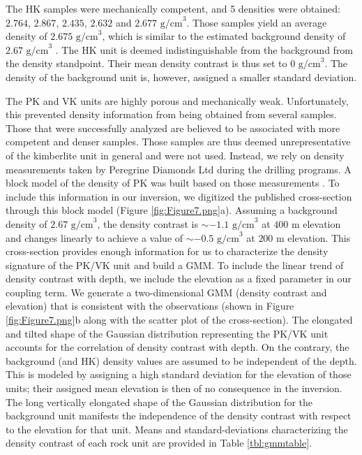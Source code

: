 \documentclass[paper, twocolumn]{geophysics} %
\begin{document}
The HK samples were mechanically competent, and 5 densities were obtained: $2.764$, $2.867$, $2.435$, $2.632$ and $2.677 \text{ g/cm}^3$. Those samples yield an average density of $2.675 \text{ g/cm}^3$, which is similar to the estimated background density of $2.67 \text{ g/cm}^3$ \citep{TKCpaper}. The HK unit is deemed indistinguishable from the background from the density standpoint. Their mean density contrast is thus set to $0 \text{ g/cm}^3$. The density of the background unit is, however, assigned a smaller standard deviation.

The PK and VK units are highly porous and mechanically weak. Unfortunately, this prevented density information from being obtained from several samples. Those that were successfully analyzed are believed to be associated with more competent and denser samples. Those samples are thus deemed unrepresentative of the kimberlite unit in general and were not used. Instead, we rely on density measurements taken by Peregrine Diamonds Ltd during the drilling programs. A block model of the density of PK was built based on those measurements \citep{TechnicalReport}. To include this information in our inversion, we digitized the published cross-section through this block model (Figure \ref{fig:Figure7.png}a). Assuming a background density of $2.67 \text{ g/cm}^3$, the density contrast is $\sim-1.1 \text{ g/cm}^3$ at $400$ m elevation and changes linearly to achieve a value of $\sim-0.5 \text{ g/cm}^3$ at $200$ m elevation.
This cross-section provides enough information for us to characterize the density signature of the PK/VK unit and build a GMM. To include the linear trend of density contrast with depth, we include the elevation as a fixed parameter in our coupling term. We generate a two-dimensional GMM (density contrast and elevation) that is consistent with the observations (shown in Figure \ref{fig:Figure7.png}b along with the scatter plot of the cross-section). The elongated and tilted shape of the Gaussian distribution representing the PK/VK unit accounts for the correlation of density contrast with depth. On the contrary, the background (and HK) density values are assumed to be independent of the depth. This is modeled by assigning a high standard deviation for the elevation of those units; their assigned mean elevation is then of no consequence in the inversion. The long vertically elongated shape of the Gaussian distribution for the background unit manifests the independence of the density contrast with respect to the elevation for that unit. Means and standard-deviations characterizing the density contrast of each rock unit are provided in Table \ref{tbl:gmmtable}.
\end{document}
